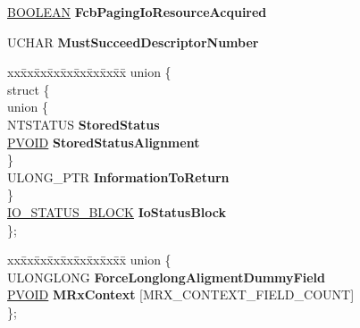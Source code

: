 \begin{DoxyCompactItemize}
\hyperlink{_processor_bind_8h_a112e3146cb38b6ee95e64d85842e380a}{B\+O\+O\+L\+E\+AN} {\bfseries Fcb\+Paging\+Io\+Resource\+Acquired}
\item 
\mbox{\label{struct___r_x___c_o_n_t_e_x_t_a6beaa5ba73ca2dd96c611f1ef1e8735f}} 
U\+C\+H\+AR {\bfseries Must\+Succeed\+Descriptor\+Number}
\item 
\mbox{\label{struct___r_x___c_o_n_t_e_x_t_a8560e42c14bff91894e494321937acf1}} 
\begin{tabbing}
xx\=xx\=xx\=xx\=xx\=xx\=xx\=xx\=xx\=\kill
union \{\\
\mbox{\label{union___r_x___c_o_n_t_e_x_t_1_1_0D1779_ab18652a32baa8866da71fa7d39d45289}} 
\>struct \{\\
\mbox{\label{struct___r_x___c_o_n_t_e_x_t_1_1_0D1779_1_1_0D1787_a3c095bd4d1310470a72f1acd1f73cb47}} 
\>\>union \{\\
\>\>\>NTSTATUS {\bfseries StoredStatus}\\
\>\>\>\hyperlink{interfacevoid}{PVOID} {\bfseries StoredStatusAlignment}\\
\>\>\} \\
\>\>ULONG\_PTR {\bfseries InformationToReturn}\\
\>\} \\
\>\hyperlink{struct___i_o___s_t_a_t_u_s___b_l_o_c_k}{IO\_STATUS\_BLOCK} {\bfseries IoStatusBlock}\\
\}; \\

\end{tabbing}\item 
\mbox{\label{struct___r_x___c_o_n_t_e_x_t_aba5a7d4dd238e3a8b0836a8ec3a50ca9}} 
\begin{tabbing}
xx\=xx\=xx\=xx\=xx\=xx\=xx\=xx\=xx\=\kill
union \{\\
\>ULONGLONG {\bfseries ForceLonglongAligmentDummyField}\\
\>\hyperlink{interfacevoid}{PVOID} {\bfseries MRxContext} \mbox{[}MRX\_CONTEXT\_FIELD\_COUNT\mbox{]}\\
\}; \\


\end{tabbing}
\end{DoxyCompactItemize}
